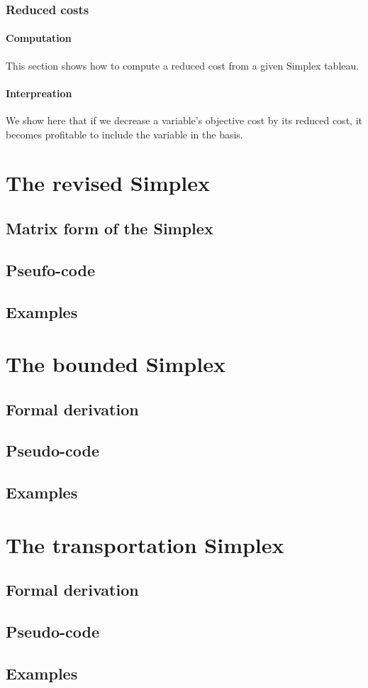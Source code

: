 \subsubsection{Reduced costs}
\paragraph{Computation}
This section shows how to compute a reduced cost from a given Simplex tableau. 
\paragraph{Interpreation}
We show here that if we decrease a variable's objective cost by its reduced cost, it becomes profitable to include the variable in the basis. 

\section{The revised Simplex}
\subsection{Matrix form of the Simplex}
\subsection{Pseufo-code}
\subsection{Examples}

\section{The bounded Simplex}
\subsection{Formal derivation}
\subsection{Pseudo-code}
\subsection{Examples}

\section{The transportation Simplex}
\subsection{Formal derivation}
\subsection{Pseudo-code}
\subsection{Examples}
